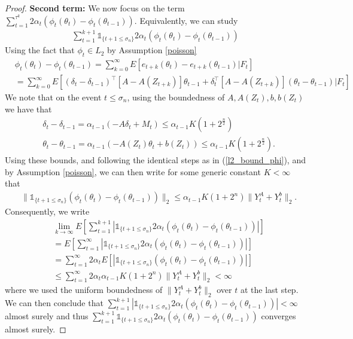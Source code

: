 \documentclass[11pt]{article}
\begin{document}
\begin{proof}
{\bf Second term:} We now focus on the term $ \sum_{t=1}^{\tau^k} 2\alpha_t \left( \phi_t(\theta_t) -\phi_t(\theta_{t-1}) \right)$. Equivalently, we can study 
\begin{align*}
 \sum_{t=1}^{k+1}\mathds{1}_{\{t+1\leq \sigma_n\}} 2\alpha_t \left( \phi_t(\theta_t) -\phi_t(\theta_{t-1}) \right)
\end{align*}
  Using the fact that $\phi_t \in L_2$ by Assumption \ref{poisson}
\begin{align*}
&\phi_t(\theta_t) -\phi_t(\theta_{t-1}) = \sum_{k=0}^\infty E\left[e_{t+k}(\theta_t) - e_{t+k}(\theta_{t-1}) |F_t\right] \\
&= \sum_{k=0}^\infty E\left[ (\delta_t - \delta_{t-1})^\intercal [A-A(Z_{t+k})] \theta_{t-1} + \delta_t^\intercal[A-A(Z_{t+k})](\theta_t - \theta_{t-1})   |F_t\right]
\end{align*}
We note that on the event $t\leq \sigma_n$, using the boundedness of $A,A(Z_t),b,b(Z_t)$ we have that 
\begin{align*}
&\delta_t - \delta_{t-1} = \alpha_{t-1}(-A\delta_t + M_t) \leq \alpha_{t-1} K (1+2^{\frac{n}{2}})\\
&\theta_t-\theta_{t-1} = \alpha_{t-1}(-A(Z_t)\theta_t + b(Z_t))\leq \alpha_{t-1} K (1+2^{\frac{n}{2}}).
\end{align*}
Using these bounds, and following the identical steps as in (\ref{l2_bound_phi}),  and by Assumption \ref{poisson}, we can then write for some generic constant $K<\infty$ that
\begin{align*}
&\| \mathds{1}_{\{t+1\leq \sigma_n\}}\left(\phi_t(\theta_t) -\phi_t(\theta_{t-1})\right)\|_2 \leq \alpha_{t-1} K (1+2^n)\|Y_t^A+Y_t^b\|_2.
\end{align*}
Consequently, we write 
\begin{align*}
&\lim_{k\to\infty}E\left[  \sum_{t=1}^{k+1}\left|\mathds{1}_{\{t+1\leq \sigma_n\}} 2\alpha_t \left( \phi_t(\theta_t) -\phi_t(\theta_{t-1}) \right)\right| \right]\\
&=E\left[  \sum_{t=1}^{\infty}\left|\mathds{1}_{\{t+1\leq \sigma_n\}} 2\alpha_t \left( \phi_t(\theta_t) -\phi_t(\theta_{t-1}) \right)\right| \right]\\
&=\sum_{t=1}^{\infty} 2\alpha_t E\left[  \left|\mathds{1}_{\{t+1\leq \sigma_n\}}\left( \phi_t(\theta_t) -\phi_t(\theta_{t-1}) \right)\right| \right]\\
&\leq \sum_{t=1}^{\infty} 2\alpha_t \alpha_{t-1} K (1+2^n)\|Y_t^A+Y_t^b\|_2 <\infty
\end{align*}
where we used the uniform boundedness of $\|Y_t^A+Y_t^b\|_2 $ over $t$ at the last step. We can then conclude that $ \sum_{t=1}^{k+1}\left|\mathds{1}_{\{t+1\leq \sigma_n\}} 2\alpha_t \left( \phi_t(\theta_t) -\phi_t(\theta_{t-1}) \right)\right|<\infty$  almost surely and thus $ \sum_{t=1}^{k+1}\mathds{1}_{\{t+1\leq \sigma_n\}} 2\alpha_t \left( \phi_t(\theta_t) -\phi_t(\theta_{t-1}) \right)$  converges almost surely.


\end{proof}
\end{document}
